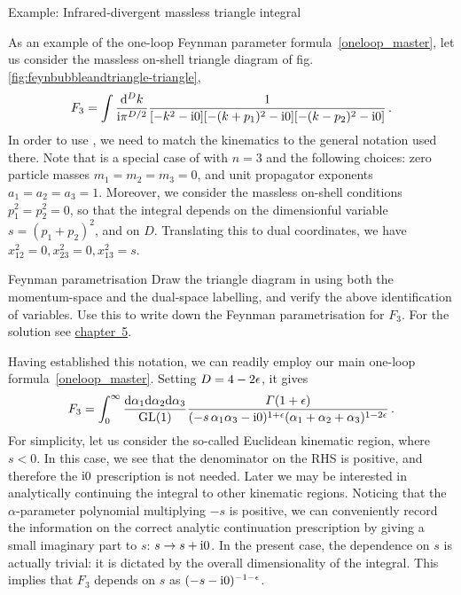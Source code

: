 \begin{example}{Example: Infrared-divergent massless triangle integral}

As an example of the one-loop Feynman parameter formula~\eqref{oneloop_master}, let us consider the massless on-shell triangle diagram of fig.~ \ref{fig:feynbubbleandtriangle-triangle},
\begin{align}\label{F3examplemomentumspace}
F_3 =  \int \frac{\mathrm{d}^{D}k}{\mathrm{i} \pi^{D/2}} \frac{1}{[-k^2 -\mathrm{i} 0] [-(k+p_{1})^2-\mathrm{i} 0] [- (k-p_{2})^2 -\mathrm{i} 0]} \,.
\end{align}
In order to use , we need to match the kinematics to the general notation used there.
Note that  is a special case of  with $n=3$ and the following choices:
zero particle masses $m_1=m_2=m_3=0$, and unit propagator exponents $a_1 = a_2= a_3 =1$.
Moreover, we consider the massless on-shell conditions $p_{1}^2= p_{2}^2 = 0$, 
so that the integral depends on the dimensionful variable $s = (p_{1}+p_{2})^2$, and on $D$.
Translating this to dual coordinates, we have $x_{12}^2= 0, x_{23}^2=0, x_{13}^2 =s$.
\begin{exer}{Feynman parametrisation}
\label{Ex:4.FeynPar}
Draw the triangle diagram in  using both the momentum-space and the dual-space labelling, and verify the above identification of variables.
Use this to write down the Feynman parametrisation for $F_{3}$.
For the solution see \hyperref[Sol:4.FeynPar]{chapter~5}.
\end{exer}

%
Having established this notation, we can readily employ our main one-loop formula~\ref{oneloop_master}.
Setting $D=4-2 \epsilon$, it gives
\begin{align}\label{F3triangleFeynman}
F_3 =  \int_0^{\infty} \frac{ \d\alpha_1 \d\alpha_2 \d\alpha_3}{{\rm GL}(1)} \frac{\Gamma(1+\eps)}{(-s \, \alpha_1 \alpha_3 -\i 0)^{1+\eps} (\alpha_1 + \alpha_2 + \alpha_3 )^{1-2\eps} } \, .
\end{align}
For simplicity, let us consider the so-called Euclidean kinematic region, where $s<0$. In this case, we see that the denominator on the RHS is positive, and therefore the $\mathrm{i} 0$ prescription is not needed. 
Later we may be interested in analytically continuing the integral to other kinematic regions. Noticing that the $\alpha$-parameter polynomial multiplying $-s$ is positive, we can conveniently record the information on the correct analytic continuation prescription  by giving a small imaginary part to $s$: $s \to s + \mathrm{i} 0$.
In the present case, the dependence on $s$ is actually trivial: it is dictated by the overall dimensionality of the integral.
This implies that $F_3$ depends on $s$ as $(-s-\mathrm{i} 0)^{-1-\epsilon}$.


\end{example}
